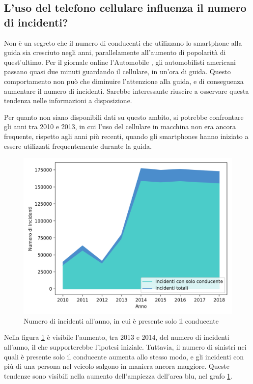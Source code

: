 \documentclass[a4paper,12pt]{report}
\begin{document}
\subsection{L'uso del telefono cellulare influenza il numero di incidenti?}

Non è un segreto che il numero di conducenti che utilizzano lo smartphone alla guida 
sia cresciuto negli anni, parallelamente all'aumento di popolarità di quest'ultimo. 
Per il giornale online l'Automobile \cite{AUTOMOBILE:1}, gli automobilisti americani 
passano quasi due minuti guardando il cellulare, in un'ora di guida.
Questo comportamento non può che diminuire l'attenzione alla guida, e di conseguenza 
aumentare il numero di incidenti. 
Sarebbe interessante riuscire a osservare questa tendenza nelle informazioni a disposizione.

Per quanto non siano disponibili dati su questo ambito, si potrebbe confrontare gli 
anni tra 2010 e 2013, in cui l'uso del cellulare in macchina non era ancora frequente, 
rispetto agli anni più recenti, quando gli smartphones hanno iniziato a essere utilizzati 
frequentemente durante la guida.

\begin{figure}
    \includegraphics[width=\linewidth]{../src/incidenti/incidenti_senza_coords/anno/incremento_incidenti.png}
    \caption{Numero di incidenti all'anno, in cui è presente solo il conducente}
    \label{fig:incremento-incidenti}
\end{figure}

Nella figura \ref{fig:incremento-incidenti} è visibile l'aumento, tra 2013 e 2014, del 
numero di incidenti all'anno, il che supporterebbe l'ipotesi iniziale.
Tuttavia, il numero di sinistri nei quali è presente solo il conducente 
aumenta allo stesso modo, e gli incidenti con più di una persona nel veicolo 
salgono in maniera ancora maggiore. 
Queste tendenze sono visibili nella aumento dell'ampiezza dell'area blu, nel grafo 
\ref{fig:incremento-incidenti}.
\end{document}
